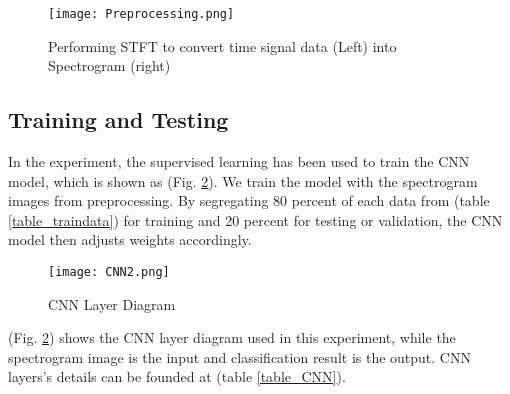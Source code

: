 \documentclass[conference]{IEEEtran}
\begin{document}
\begin{figure}[htbp]
\centerline{\texttt{[image: Preprocessing.png]}}
\caption{Performing STFT to convert time signal data (Left) into Spectrogram (right)}
\label{fig_preprocessing}
\end{figure}

\subsection{Training and Testing}

In the experiment, the supervised learning has been used to train the CNN model, which is shown as (Fig. \ref{fig_CNN}). We train the model with the spectrogram images from preprocessing. By segregating 80 percent of each data from (table \ref{table_traindata}) for training and 20 percent for testing or validation, the CNN model then adjusts weights accordingly. 

\begin{figure}[!htbp]
\centerline{\texttt{[image: CNN2.png]}}
\caption{CNN Layer Diagram}
\label{fig_CNN}
\end{figure}

(Fig. \ref{fig_CNN}) shows the CNN layer diagram used in this experiment, while the spectrogram image is the input and classification result is the output. CNN layers's details can be founded at (table \ref{table_CNN}).
\end{document}
